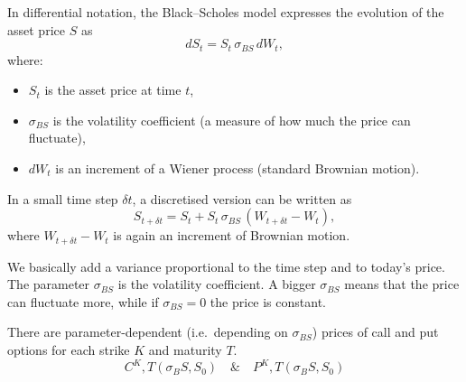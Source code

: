 \documentclass[11pt,a4paper]{article}
\theoremstyle{definition}
\theoremstyle{plain}
\theoremstyle{remark}
\begin{document}
\begin{tcolorbox}[colback=blue!3!white,colframe=blue!60!black,title={\textbf{Black--Scholes dynamics (no drift)}}]
In differential notation, the Black--Scholes model expresses the evolution of the asset price $S$ as
\begin{equation}
    dS_t = S_t \, \sigma_{BS} \, dW_t,
\end{equation}
where:
\begin{itemize}
    \item $S_t$ is the asset price at time $t$,
    \item $\sigma_{BS}$ is the volatility coefficient (a measure of how much the price can fluctuate),
    \item $dW_t$ is an increment of a Wiener process (standard Brownian motion).
\end{itemize}
In a small time step $\delta t$, a discretised version can be written as
\begin{equation}
    S_{t+\delta t} = S_t + S_t \, \sigma_{BS} \, (W_{t+\delta t} - W_t),
\end{equation}
where $W_{t+\delta t} - W_t$ is again an increment of Brownian motion.
\end{tcolorbox}

We basically add a variance proportional to the time step and to today's price.
The parameter $\sigma_{BS}$ is the volatility coefficient.
A bigger $\sigma_{BS}$ means that the price can fluctuate more, while if $\sigma_{BS}=0$ the price is constant.

There are parameter-dependent (i.e.\ depending on $\sigma_{BS}$) prices of call and
put options for each strike $K$ and maturity $T$.
\begin{equation}
    C^K,T (\sigma_BS, S_0) \quad \& \quad P^K,T (\sigma_BS, S_0)
\end{equation}
\end{document}
